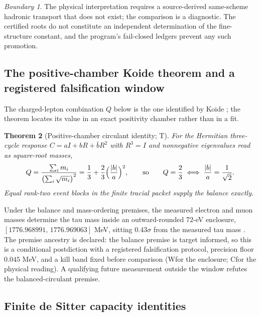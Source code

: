 \documentclass[11pt]{article}
\newtheorem{theorem}{Theorem}[section]
\theoremstyle{remark}
\newtheorem{boundary}[theorem]{Boundary}
\newcommand{\evT}{\textsf{T}}   %
\newcommand{\evW}{\textsf{W}}   %
\newcommand{\evC}{\textsf{C}}   %
\begin{document}
\begin{boundary}
The physical interpretation requires a source-derived same-scheme hadronic
transport that does not exist; the comparison is a diagnostic. The certified
roots do not constitute an independent determination of the fine-structure
constant, and the program's fail-closed ledgers prevent any such promotion.
\end{boundary}

\subsection{The positive-chamber Koide theorem and a registered
falsification window}

The charged-lepton combination $Q$ below is the one identified by Koide
\cite{koide1983}; the theorem locates its value in an exact positivity
chamber rather than in a fit.

\begin{theorem}[Positive-chamber circulant identity; \evT]
For the Hermitian three-cycle response $C=aI+bR+\bar bR^{2}$ with $R^{3}=I$
and nonnegative eigenvalues read as square-root masses,
\begin{equation}
Q=\frac{\sum_i m_i}{\bigl(\sum_i\sqrt{m_i}\bigr)^{2}}
=\frac13+\frac23\Bigl(\frac{|b|}{a}\Bigr)^{2},
\qquad\text{so}\qquad
Q=\frac23\iff\frac{|b|}{a}=\frac1{\sqrt2}.
\end{equation}
Equal rank-two event blocks in the finite tracial packet supply the balance
exactly.
\end{theorem}

Under the balance and mass-ordering premises, the measured electron and muon
masses determine the tau mass inside an outward-rounded $72$-eV enclosure,
$[1776.968991,\,1776.969063]$ MeV, sitting $0.43\sigma$ from the measured
tau mass \cite{pdg2026}. The premise ancestry is declared: the balance premise is
target informed, so this is a conditional postdiction with a registered
falsification protocol, precision floor $0.045$ MeV, and a kill band fixed
before comparison (\evW for the enclosure; \evC for the physical reading).
A qualifying future measurement outside the window refutes the
balanced-circulant premise.

\subsection{Finite de Sitter capacity identities}
\end{document}
